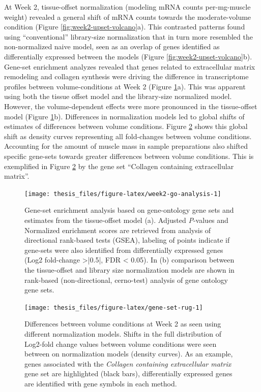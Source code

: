 \documentclass[twoside,10pt]{gihclass} %
\begin{document}
At Week 2, tissue-offset normalization (modeling mRNA counts per-mg-muscle weight) revealed a general shift of mRNA counts towards the moderate-volume condition (Figure \ref{fig:week2-upset-volcano}a).
This contrasted patterns found using ``conventional'' library-size normalization that in turn more resembled the non-normalized naive model, seen as an overlap of genes identified as differentially expressed between the models (Figure \ref{fig:week2-upset-volcano}b).
Gene-set enrichment analyzes revealed that genes related to extracellular matrix remodeling and collagen synthesis were driving the difference in transcriptome profiles between volume-conditions at Week 2
(Figure \ref{fig:week2-go-analysis}a).
This was apparent using both the tissue offset model and the library-size normalized model. However, the volume-dependent effects were more pronounced in the tissue-offset model
(Figure \ref{fig:week2-go-analysis}b).
Differences in normalization models led to global shifts of estimates of differences between volume conditions. Figure \ref{fig:gene-set-rug} shows this global shift as density curves representing all fold-changes between volume conditions. Accounting for the amount of muscle mass in sample preparations also shifted specific gene-sets towards greater differences between volume conditions. This is exemplified in Figure \ref{fig:gene-set-rug} by the gene set ``Collagen containing extracellular matrix''.
\begin{figure}

{\centering \texttt{[image: thesis\_files/figure-latex/week2-go-analysis-1]} 

}

\caption[Gene-set enrichment analysis at Week 2]{Gene-set enrichment analysis based on gene-ontology gene sets and estimates from the tissue-offset model (a). Adjusted \textit{P}-values and Normalized enrichment scores are retrieved from analysis of directional rank-based tests (GSEA), labeling of points indicate if gene-sets were also identified from differentially expressed genes (Log2 fold-change >|0.5|, FDR < 0.05). In (b) comparison between the tissue-offset and library size normalization models are shown in rank-based (non-directional, cerno-test) analysis of gene ontology gene sets.}\label{fig:week2-go-analysis}
\end{figure}
\begin{figure}

{\centering \texttt{[image: thesis\_files/figure-latex/gene-set-rug-1]} 

}

\caption[Global shifts in volume-dependent fold change as an effect of normalization methods at Week 2]{Differences between volume conditions at Week 2 as seen using different normalization models. Shifts in the full distribution of Log2-fold change values between volume conditions were seen between on normalization models (density curves). As an example, genes associated with the \textit{Collagen containing extracellular matrix} gene set are highlighted (black bars), differentially expressed genes are identified with gene symbols in each method.}\label{fig:gene-set-rug}
\end{figure}
\end{document}
